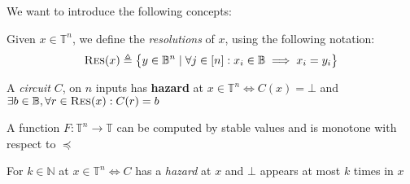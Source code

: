 We want to introduce the following concepts:

\begin{definition}
    Given $x \in \mathbb{T}^n$, we define the \textit{resolutions} of $x$, using the following notation:
    $$
    \textnormal{\textsc{Res}}(x) \triangleq \big\{ y \in \mathbb{B}^n \mid \forall j \in [n]: x_i \in \mathbb{B} \implies x_i = y_i \big\}
    $$
\end{definition}

\begin{definition}
    A \textit{circuit} $C$, on $n$ inputs has \textbf{hazard} at $x \in \mathbb{T}^n \iff C(x) = \bot$
    and $\exists b \in \mathbb{B}, \forall r \in \textnormal{\textsc{Res}}(x): C(r) = b$
\end{definition}


\begin{definition}
    A function $F: \mathbb{T}^n \to \mathbb{T}$ can be computed by stable values and is monotone with respect to $\preceq$
\end{definition}

\begin{definition}
    For $k \in \mathbb{N}$ at $x \in \mathbb{T}^n \iff C$  has a \textit{hazard} at $x$ and $\bot$ appears at most $k$ times in $x$
\end{definition}



